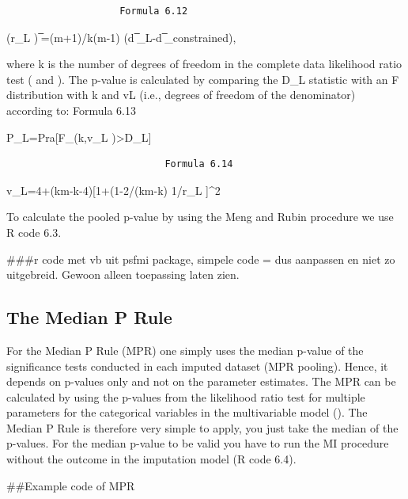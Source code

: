 \documentclass[]{book}
\newenvironment{Shaded}{\begin{snugshade}}{\end{snugshade}}
\newcommand{\NormalTok}[1]{#1}
\begin{document}
\begin{verbatim}
                    Formula 6.12
\end{verbatim}

(r\_L ) ̅=(m+1)/k(m-1) (d ̅\_L-d ̅\_constrained),

where k is the number of degrees of freedom in the complete data
likelihood ratio test (\citet{Mistler2013} and \citet{VanBuuren2018}).
The p-value is calculated by comparing the D\_L statistic with an F
distribution with k and vL (i.e., degrees of freedom of the denominator)
according to: Formula 6.13

P\_L=Pra{[}F\_(k,v\_L )\textgreater{}D\_L{]}

\begin{verbatim}
                            Formula 6.14
\end{verbatim}

v\_L=4+(km-k-4){[}1+(1-2/(km-k) 1/r\_L {]}\^{}2

To calculate the pooled p-value by using the Meng and Rubin procedure we
use R code 6.3.

\begin{Shaded}
\begin{Highlighting}[]
\NormalTok{###r code met vb uit psfmi package, simpele code = dus aanpassen en niet zo uitgebreid. Gewoon alleen toepassing laten zien. }
\end{Highlighting}
\end{Shaded}

\subsection{The Median P Rule}\label{the-median-p-rule}

For the Median P Rule (MPR) one simply uses the median p-value of the
significance tests conducted in each imputed dataset (MPR pooling).
Hence, it depends on p-values only and not on the parameter estimates.
The MPR can be calculated by using the p-values from the likelihood
ratio test for multiple parameters for the categorical variables in the
multivariable model (\citet{Eekhout2017}). The Median P Rule is
therefore very simple to apply, you just take the median of the
p-values. For the median p-value to be valid you have to run the MI
procedure without the outcome in the imputation model (R code 6.4).

\begin{Shaded}
\begin{Highlighting}[]
\NormalTok{##Example code of MPR}
\end{Highlighting}
\end{Shaded}
\end{document}
